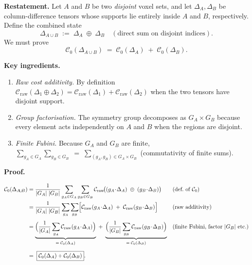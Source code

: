\documentclass[11pt]{article}
\begin{document}
\textbf{Restatement.}  
Let $A$ and $B$ be two \emph{disjoint} voxel sets, and let
$\Delta_A,\Delta_B$ be column-difference tensors whose supports lie
entirely inside $A$ and $B$, respectively.
Define the combined state
\[
\Delta_{A\!\cup\!B}\;:=\;\Delta_A \;\oplus\; \Delta_B
\quad
(\text{direct sum on disjoint indices}).
\]
We must prove
\[
\mathcal{C}_{0}(\Delta_{A\!\cup\!B})
\;=\;
\mathcal{C}_{0}(\Delta_A) \;+\; \mathcal{C}_{0}(\Delta_B).
\]

\bigskip
\textbf{Key ingredients.}
\begin{enumerate}
  \item \emph{Raw cost additivity.}
        By definition
        $\mathcal{C}_{\text{raw}}(\Delta_1\!\oplus\!\Delta_2)
        =\mathcal{C}_{\text{raw}}(\Delta_1)+\mathcal{C}_{\text{raw}}(\Delta_2)$
        when the two tensors have disjoint support.
  \item \emph{Group factorisation.}
        The symmetry group decomposes as
        $G_A\times G_B$ because every element acts independently
        on $A$ and $B$ when the regions are disjoint.
  \item \emph{Finite Fubini.}
        Because $G_A$ and $G_B$ are finite,  
        $\displaystyle
          \sum_{g_A\in G_A} \sum_{g_B\in G_B}
        \;=\;
          \sum_{(g_A,g_B)\in G_A\times G_B}$
        (commutativity of finite sums).
\end{enumerate}

\bigskip
\textbf{Proof.}

\[
\begin{aligned}
\mathcal{C}_{0}(\Delta_{A\!\cup\!B})
&= \frac{1}{|G_A|\;|G_B|}
   \sum_{g_A\in G_A}
   \sum_{g_B\in G_B}
   \mathcal{C}_{\text{raw}}\!
      \bigl( (g_A\!\cdot\!\Delta_A)\;\oplus\;(g_B\!\cdot\!\Delta_B) \bigr)
      &&\text{(def.\ of }\mathcal{C}_{0}\text{)}\\
&= \frac{1}{|G_A|\;|G_B|}
   \sum_{g_A}\sum_{g_B}
   \Bigl[
     \mathcal{C}_{\text{raw}}(g_A\!\cdot\!\Delta_A)
     \;+\;
     \mathcal{C}_{\text{raw}}(g_B\!\cdot\!\Delta_B)
   \Bigr]                           &&\text{(raw additivity)}\\[4pt]
&= \underbrace{\Bigl(\frac{1}{|G_A|}\sum_{g_A}
     \mathcal{C}_{\text{raw}}(g_A\!\cdot\!\Delta_A)\Bigr)}_{=\;\mathcal{C}_{0}(\Delta_A)}
   \;+\;
   \underbrace{\Bigl(\frac{1}{|G_B|}\sum_{g_B}
     \mathcal{C}_{\text{raw}}(g_B\!\cdot\!\Delta_B)\Bigr)}_{=\;\mathcal{C}_{0}(\Delta_B)}
   &&\text{(finite Fubini, factor $|G_B|$ etc.)}\\[6pt]
&=\;
\boxed{\mathcal{C}_{0}(\Delta_A)+\mathcal{C}_{0}(\Delta_B)}.
\end{aligned}
\]
\end{document}
